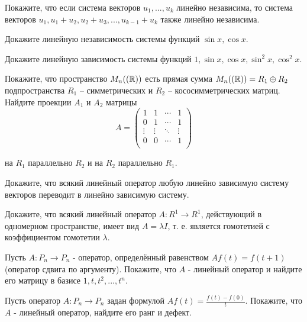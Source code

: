 



\begin{list}{.}{}

\item Покажите, что если система векторов $u_1, ..., u_k$ линейно независима, то система векторов $u_1, u_1+u_2, u_2+u_3, ..., u_{k-1}+u_k$ также линейно независима.

\item Докажите линейную независимость системы функций $\sin x, \cos x$.

\item Докажите линейную зависимость системы функций $1, \sin x, \cos x, \sin^2 x, \cos^2 x$.

\item Покажите, что пространство $M_n((\mathbb{R}))$ есть прямая сумма $M_n((\mathbb{R}))=R_1 \oplus R_2$ подпространства $R_1$ -- симметрических и $R_2$ -- кососимметрических матриц. Найдите проекции $A_1$ и $A_2$ матрицы
$$A=
\begin{pmatrix}
1 & 1 & \cdots & 1\\
0 & 1 & \cdots & 1\\
\vdots & \vdots & \ddots & \vdots\\
0 & 0 & \cdots & 1\\
\end{pmatrix}
$$

на $R_1$ параллельно $R_2$ и на $R_2$ параллельно $R_1$.

\item Докажите, что всякий линейный оператор любую линейно зависимую систему векторов переводит в линейно зависимую систему.

\item Докажите, что всякий линейный оператор $A:R^1 \to R^1$, действующий в одномерном пространстве, имеет вид $A=\lambda I$, т. е. является гомотетией с коэффициентом гомотетии $\lambda$.

\item Пусть $A:P_n \to P_n$ - оператор, определённый равенством $Af(t)=f(t+1)$ (оператор сдвига по аргументу). Покажите, что $A$ - линейный оператор и найдите его матрицу в базисе $1, t, t^2,...,t^n$.

\item Пусть оператор $A:P_n \to P_n$ задан формулой $A f(t)=\frac{f(t)-f(0)}{t}$. Покажите, что $A$ - линейный оператор, найдите его ранг и дефект.


\end{list}
